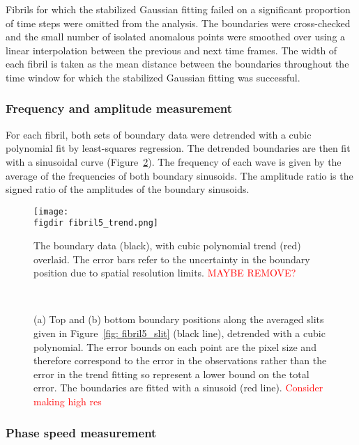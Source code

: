 \documentclass[12pt]{../style-files/ociamthesis}
\newcommand{\figdir}{../main/figures/chpt-5/} %
\begin{document}
Fibrils for which the stabilized Gaussian fitting failed on a significant proportion of time steps were omitted from the analysis. The boundaries were cross-checked and the small number of isolated anomalous points were smoothed over using a linear interpolation between the previous and next time frames. The width of each fibril is taken as the mean distance between the boundaries throughout the time window for which the stabilized Gaussian fitting was successful.


\subsubsection{Frequency and amplitude measurement} \label{sec:freq amp}
For each fibril, both sets of boundary data were detrended with a cubic polynomial fit by least-squares regression. The detrended boundaries are then fit with a sinusoidal curve (Figure~\ref{fig: fibril5_detrend}). The frequency of each wave is given by the average of the frequencies of both boundary sinusoids. The amplitude ratio is the signed ratio of the amplitudes of the boundary sinusoids.

\begin{figure}
\centering
\texttt{[image: \\figdir fibril5\_trend.png]}
\caption{The boundary data (black), with cubic polynomial trend (red) overlaid. The error bars refer to the uncertainty in the boundary position due to spatial resolution limits. \textcolor{red}{MAYBE REMOVE?}}
\label{fig: fibril5_trend}
\end{figure}

\begin{figure}
	\centering
	 \\
	\caption{(a) Top and (b) bottom boundary positions along the averaged slits given in Figure~\ref{fig: fibril5_slit} (black line), detrended with a cubic polynomial. The error bounds on each point are the pixel size and therefore correspond to the error in the observations rather than the error in the trend fitting so represent a lower bound on the total error. The boundaries are fitted with a sinusoid (red line). \textcolor{red}{Consider making high res}}
	\label{fig: fibril5_detrend}
\end{figure}


\subsubsection{Phase speed measurement} \label{sec:phase speed}
\end{document}
